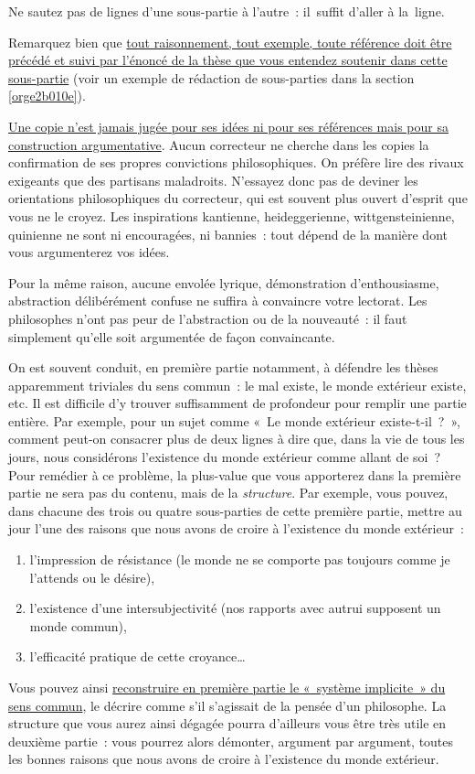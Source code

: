 \documentclass[a4paper,12pt]{report}
\begin{document}
Ne sautez pas de lignes d'une sous-partie à l'autre : il suffit d'aller
à la ligne.

Remarquez bien que \uline{tout raisonnement, tout exemple, toute référence
doit être précédé et suivi par l'énoncé de la thèse que vous entendez
soutenir dans cette sous-partie} (voir un exemple de rédaction de
sous-parties dans la section \ref{orge2b010e}).

\uline{Une copie n'est jamais jugée pour ses idées ni pour ses références mais
pour sa construction argumentative}. Aucun correcteur ne cherche dans
les copies la confirmation de ses propres convictions philosophiques. On
préfère lire des rivaux exigeants que des partisans maladroits.
N'essayez donc pas de deviner les orientations philosophiques du
correcteur, qui est souvent plus ouvert d'esprit que vous ne le croyez.
Les inspirations kantienne, heideggerienne, wittgensteinienne, quinienne
ne sont ni encouragées, ni bannies : tout dépend de la manière dont vous
argumenterez vos idées.

Pour la même raison, aucune envolée lyrique, démonstration
d'enthousiasme, abstraction délibérément confuse ne suffira à convaincre
votre lectorat. Les philosophes n'ont pas peur de l'abstraction ou de la
nouveauté : il faut simplement qu'elle soit argumentée de façon
convaincante.

On est souvent conduit, en première partie notamment, à défendre les
thèses apparemment triviales du sens commun : le mal existe, le monde
extérieur existe, etc. Il est difficile d'y trouver suffisamment de
profondeur pour remplir une partie entière. Par exemple, pour un sujet
comme « Le monde extérieur existe-t-il ? », comment peut-on consacrer
plus de deux lignes à dire que, dans la vie de tous les jours, nous
considérons l'existence du monde extérieur comme allant de soi ?
Pour remédier à ce problème, la plus-value que vous apporterez dans la
première partie ne sera pas du contenu, mais de la \emph{structure}. Par
exemple, vous pouvez, dans chacune des trois ou quatre sous-parties de
cette première partie, mettre au jour l'une des raisons que nous avons
de croire à l'existence du monde extérieur :
\begin{enumerate}
\item l'impression de résistance (le monde ne se comporte pas toujours
comme je l'attends ou le désire),
\item l'existence d'une intersubjectivité (nos rapports avec autrui
supposent un monde commun),
\item l'efficacité pratique de cette croyance\ldots{}
\end{enumerate}
Vous pouvez ainsi \uline{reconstruire en première partie le « système
implicite » du sens commun}, le décrire comme s'il s'agissait de la
pensée d'un philosophe. La structure que vous aurez ainsi dégagée pourra
d'ailleurs vous être très utile en deuxième partie : vous pourrez alors
démonter, argument par argument, toutes les bonnes raisons que nous
avons de croire à l'existence du monde extérieur.
\end{document}
